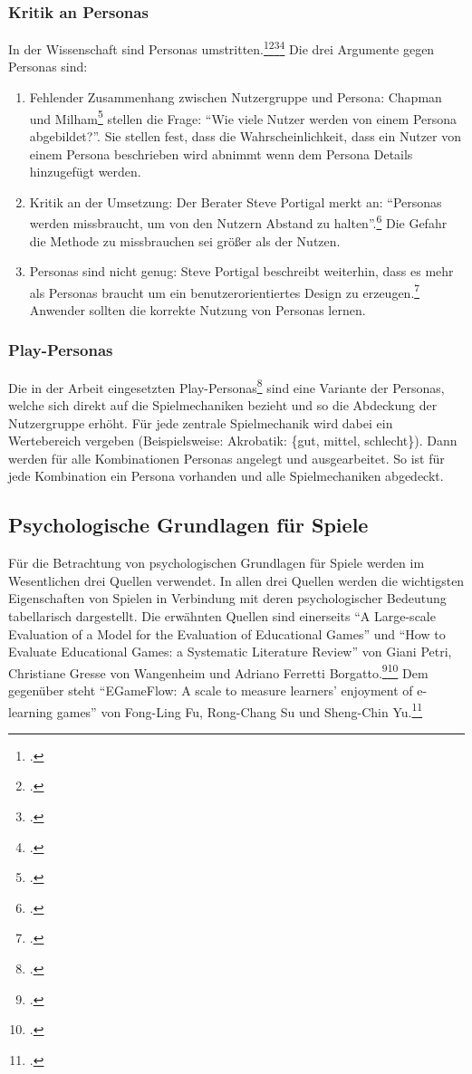	\subsubsection{Kritik an Personas}
		In der Wissenschaft sind Personas umstritten.\footcite{persona-crit}\footcite{persona-crit2}\footcite{persona-crit3}\footcite{persona-crit4} Die drei Argumente gegen Personas sind:
		\begin{enumerate}\obeylines
			\item{ Fehlender Zusammenhang zwischen Nutzergruppe und Persona: Chapman und Milham\footcite{persona-crit} stellen die Frage: \enquote{Wie viele Nutzer werden von einem Persona abgebildet?}. Sie stellen fest, dass die Wahrscheinlichkeit, dass ein Nutzer von einem Persona beschrieben wird abnimmt wenn dem Persona Details hinzugefügt werden. }
			\item{ Kritik an der Umsetzung: Der Berater Steve Portigal merkt an: \enquote{Personas werden missbraucht, um von den Nutzern Abstand zu halten}.\footcite[Übersetzt aus dem Orginal: \enquote{Personas are misused to maintain a “safe” distance from the people we design for [\dots]}]{persona-crit4}
			Die Gefahr die Methode zu missbrauchen sei größer als der Nutzen. }
			\item{ Personas sind nicht genug: Steve Portigal beschreibt weiterhin, dass es mehr als Personas braucht um ein benutzerorientiertes Design zu erzeugen.\footcite[Seite 4, links]{persona-crit4} Anwender sollten die korrekte Nutzung von Personas lernen. }
		\end{enumerate}
	\subsubsection{Play-Personas}
		Die in der Arbeit eingesetzten Play-Personas\footcite{play-persona} sind eine Variante der Personas, welche sich direkt auf die Spielmechaniken bezieht und so die Abdeckung der Nutzergruppe erhöht. Für jede zentrale Spielmechanik wird dabei ein Wertebereich vergeben (Beispielsweise: Akrobatik: \{gut, mittel, schlecht\}). Dann werden für alle Kombinationen Personas angelegt und ausgearbeitet. So ist für jede Kombination ein Persona vorhanden und alle Spielmechaniken abgedeckt.

\subsection{Psychologische Grundlagen für Spiele}\label{ssec:psycho-grundlagen}
	Für die Betrachtung von psychologischen Grundlagen für Spiele werden im Wesentlichen drei Quellen verwendet. In allen drei Quellen werden die wichtigsten Eigenschaften von Spielen in Verbindung mit deren psychologischer Bedeutung tabellarisch dargestellt.
	Die erwähnten Quellen sind einerseits  \enquote{A Large-scale Evaluation of a Model for the Evaluation of Educational Games} und \enquote{How to Evaluate Educational Games: a Systematic Literature Review} von Giani Petri, Christiane Gresse von Wangenheim und Adriano Ferretti Borgatto.\footcite{psych1}\footcite{psych3} Dem gegenüber steht \enquote{EGameFlow: A scale to measure learners' enjoyment of e-learning games} von Fong-Ling Fu, Rong-Chang Su und Sheng-Chin Yu.\footcite{psych2}


